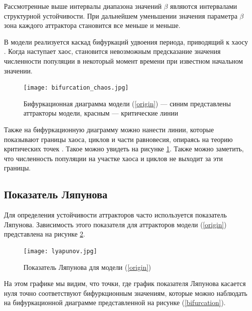         Рассмотренные выше интервалы диапазона значений \(\beta\) являются интервалами структурной устойчивости. При дальнейшем уменьшении значения параметра \(\beta\) зона каждого аттрактора становится все меньше и меньше. 
        
        В модели реализуется каскад бифуркаций удвоения периода, приводящий к хаосу \cite[стр. 33]{elementsOfNonlinearDynamic}. Когда наступает хаос, становится невозможным предсказание значения численности популяции в некоторый момент времени при известном начальном значении.
        
        \begin{figure}
            \centering
            \texttt{[image: bifurcation\_chaos.jpg]}

            \captionsetup{justification=centering}
            \caption{Бифуркационная диаграмма модели (\ref{origin}) --- синим представлены аттракторы модели, красным --- критические линии }
            \label{bifurcation_chaos}
        \end{figure}
        
        Также на бифуркационную диаграмму можно нанести линии, которые показывают границы хаоса, циклов и части равновесия, опираясь на теорию критических точек \cite{nonsmoothOneDimensionalMapsSomeBasicConceptsAndDefinitions}. Такое можно увидеть на рисунке \ref{bifurcation_chaos}. Также можно заметить, что численность популяции на участке хаоса и циклов не выходит за эти границы.

    \subsection{Показатель Ляпунова}    

        Для определения устойчивости аттракторов часто используется показатель Ляпунова. Зависимость этого показателя для аттракторов модели (\ref{origin}) представлена на рисунке \ref{lyapunov}. 

        \begin{figure}
            \centering
            \texttt{[image: lyapunov.jpg]}

            \captionsetup{justification=centering}
            \caption{Показатель Ляпунова для модели (\ref{origin})}
            \label{lyapunov}
        \end{figure}

        На этом графике мы видим, что точки, где график показателя Ляпунова касается нуля точно соответствуют бифуркционным значениям, которые можно наблюдать на бифуркационной диаграмме представленной на рисунке (\ref{bifurcation}).

